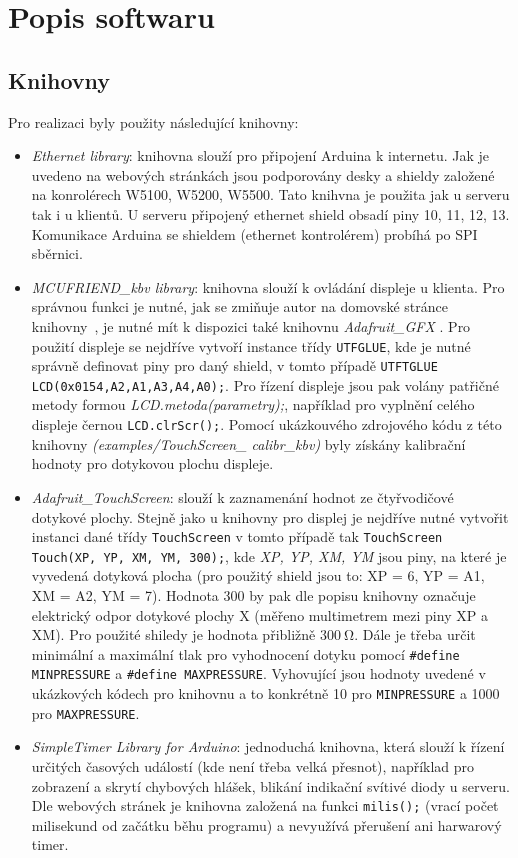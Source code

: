 \section{Popis softwaru}
\subsection{Knihovny}
Pro realizaci byly použity následující knihovny:
\begin{itemize}
  \item \textit{Ethernet library}: knihovna slouží pro připojení Arduina k internetu. Jak je uvedeno na webových stránkách \cite{EthLib} jsou podporovány desky a shieldy založené na konrolérech W5100, W5200, W5500. Tato knihvna je použita jak u serveru tak i u klientů. U serveru připojený ethernet shield obsadí piny 10, 11, 12, 13. Komunikace Arduina se shieldem (ethernet kontrolérem) probíhá po SPI sběrnici.

  \item \textit{MCUFRIEND\_kbv library}: knihovna slouží k ovládání displeje u klienta. Pro správnou funkci je nutné, jak se zmiňuje autor na domovské stránce knihovny~\cite{lib_MCUFRIEND_kbv}, je nutné mít k dispozici také knihovnu \textit{Adafruit\_GFX} \cite{lib_adafruitGFX}. Pro použití displeje se nejdříve vytvoří instance třídy \texttt{UTFGLUE}, kde je nutné správně definovat piny pro daný shield, v tomto případě \texttt{UTFTGLUE LCD(0x0154,A2,A1,A3,A4,A0);}. Pro řízení displeje jsou pak volány patřičné metody formou \textit{LCD.metoda(parametry);}, například pro vyplnění celého displeje černou \texttt{LCD.clrScr();}. Pomocí ukázkouvého zdrojového kódu z této knihovny \textit{(examples/TouchScreen\_
calibr\_kbv)} byly získány kalibrační hodnoty pro dotykovou plochu displeje.

  \item \textit{Adafruit\_TouchScreen}: slouží k zaznamenání hodnot ze čtyřvodičové dotykové plochy. Stejně jako u knihovny pro displej je nejdříve nutné vytvořit instanci dané třídy \texttt{TouchScreen} v tomto případě tak \texttt{TouchScreen Touch(XP, YP, XM, YM, 300);}, kde \textit{XP, YP, XM, YM} jsou piny, na které je vyvedená dotyková plocha (pro použitý shield jsou to: XP = 6, YP = A1, XM = A2, YM = 7). Hodnota 300 by pak dle popisu knihovny \cite{lib_touch} označuje elektrický odpor dotykové plochy X (měřeno multimetrem mezi piny XP a XM). Pro použité shiledy je hodnota přibližně $300  \ \mathrm{\Omega}$. Dále je třeba určit minimální a maximální tlak pro vyhodnocení dotyku pomocí \texttt{\#define MINPRESSURE} a \texttt{\#define MAXPRESSURE}. Vyhovující jsou hodnoty uvedené v ukázkových kódech pro knihovnu a to konkrétně 10 pro \texttt{MINPRESSURE} a 1000 pro \texttt{MAXPRESSURE}.

  \item \textit{SimpleTimer Library for Arduino}: jednoduchá knihovna, která slouží k řízení určitých časových událostí (kde není třeba velká přesnot), například pro zobrazení a skrytí chybových hlášek, blikání indikační svítivé diody u serveru. Dle webových stránek \cite{lib_simpleTimer} je knihovna založená na funkci \texttt{milis();} (vrací počet milisekund od začátku běhu programu) a nevyužívá přerušení ani harwarový timer.
\end{itemize}

